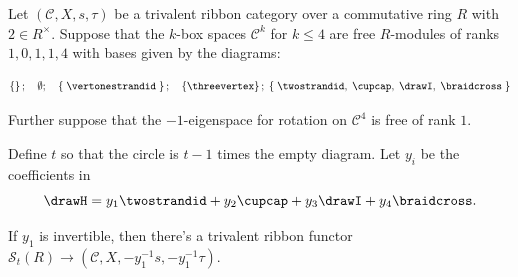 \documentclass[12pt]{amsart}
\begin{document}
\begin{theorem} \label{thm:StMain}
    Let $(\mathcal{C},X, s, \tau)$ be a trivalent ribbon category over a commutative ring $R$ with $2 \in R^\times$. Suppose that the $k$-box spaces $\mathcal{C}^k$ for $k \leq 4$ are free $R$-modules of ranks $1,0,1,1,4$ with bases given by the diagrams:

    \begin{equation*}
        \left\{ \right\}; \quad \emptyset; \quad 
        \left\{\; \vertonestrandid \; \right\}; \quad
        \left\{\threevertex\right\}; \;
        \left\{\;   \twostrandid,\; \cupcap,\; \drawI,\; \braidcross \;\right\}
    \end{equation*}

    Further suppose that the $-1$-eigenspace for rotation on $\mathcal{C}^4$ is free of rank $1$.

    Define $t$ so that the circle is $t-1$ times the empty diagram. Let $y_i$ be the coefficients in
    \[\drawH =  y_1 \twostrandid + y_2 \cupcap + y_3 \drawI + y_4 \braidcross.\]

     If $y_1$ is invertible, then there's a trivalent ribbon functor $\mathcal{S}_t(R) \rightarrow (\mathcal{C},X,-y_1^{-1}s,-y_1^{-1}\tau)$.
\end{theorem}
\end{document}
